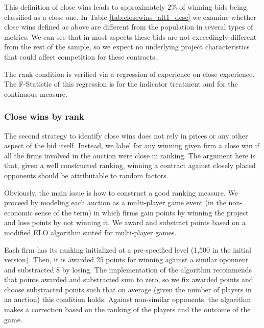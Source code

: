 This definition of close wins leads to approximately 2\% of winning bids being classified as a close one. In Table \ref{tab:closewins_alt1_desc} we examine whether close wins defined as above are different from the population in several types of metrics. We can see that in most aspects these bids are not exceedingly different from the rest of the sample, so we expect no underlying project characteristics that could affect competition for these contracts.



The rank condition is verified via a regression of experience on close experience. The F-Statistic of this regression is for the indicator treatment and for the continuous measure.

\subsubsection{Close wins by rank}

The second strategy to identify close wins does not rely in prices or any other aspect of the bid itself. Instead, we label for any winning given firm a close win if all the firms involved in the auction were close in ranking. The argument here is that, given a well constructed ranking, winning a contract against closely placed opponents should be attributable to random factors.

Obviously, the main issue is how to construct a good ranking measure. We proceed by  modeling each auction as a multi-player game event (in the non-economic sense of the term) in which firms gain points by winning the project and lose points by not winning it. We award and substract points based on a modified ELO algorithm suited for multi-player games.

Each firm has its ranking initialized at a pre-specified level (1,500 in the initial version). Then, it is awarded 25 points for winning against a similar oponnent and substracted 8 by losing. The implementation of the algorithm recommends that points awarded and substracted sum to zero, so we fix awarded points and choose substracted points such that on average (given the number of players in an auction) this condition holds. Against non-similar opponents, the algorithm makes a correction based on the ranking of the players and the outcome of the game.

